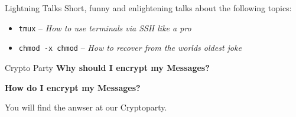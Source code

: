 \documentclass[10pt,graphics,aspectratio=169,table]{beamer}
\begin{document}
\begin{frame}{Lightning Talks}
    Short, funny and enlightening talks about the following topics:
    \begin{itemize}
        \item \texttt{tmux} -- \emph{How to use terminals via SSH like a pro}
        \item \texttt{chmod -x chmod} -- \emph{How to recover from the worlds oldest joke}
    \end{itemize}
\end{frame}



\begin{frame}{Crypto Party}
    \centering \Large \textbf{Why should I encrypt my Messages?}

    \pause{}
    \textbf{How do I encrypt my Messages?}

    \vspace{.5cm}
    \pause{}
    \alert{You will find the anwser at our Cryptoparty.}
\end{frame}
\end{document}
